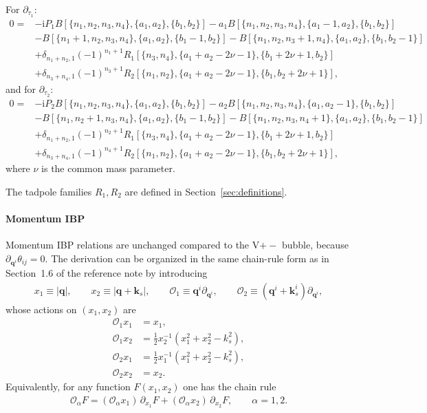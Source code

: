 \documentclass[a4paper,12pt]{article}
\def\pd{\partial}
\def\ii{\mathrm{i}}
\begin{document}
For $\pd_{\tau_1}$:
\begin{align}
	0 = & - \ii P_1 B[\{n_1,n_2,n_3,n_4\},\{a_1,a_2\},\{b_1,b_2\}] - a_1B[\{n_1,n_2,n_3,n_4\},\{a_1-1,a_2\},\{b_1,b_2\}]\nonumber \\
	    & - B[\{n_1+1,n_2,n_3,n_4\},\{a_1,a_2\},\{b_1-1,b_2\}] - B[\{n_1,n_2,n_3+1,n_4\},\{a_1,a_2\},\{b_1,b_2-1\}]\nonumber      \\
	    & +\delta_{n_1+n_2,1}(-1)^{n_1+1}R_1[\{n_3,n_4\},\{a_1+a_2-2\nu-1\},\{b_1+2\nu+1,b_2\}]\nonumber                \\
	    & +\delta_{n_3+n_4,1}(-1)^{n_3+1}R_2[\{n_1,n_2\},\{a_1+a_2-2\nu-1\},\{b_1,b_2+2\nu+1\}], \label{eq:timeIBP_tau1}
\end{align}
and for $\partial_{\tau_2}$:
\begin{align}
	0 = & - \ii P_2 B[\{n_1,n_2,n_3,n_4\},\{a_1,a_2\},\{b_1,b_2\}] - a_2B[\{n_1,n_2,n_3,n_4\},\{a_1,a_2-1\},\{b_1,b_2\}]\nonumber \\
	    & - B[\{n_1,n_2+1,n_3,n_4\},\{a_1,a_2\},\{b_1-1,b_2\}] - B[\{n_1,n_2,n_3,n_4+1\},\{a_1,a_2\},\{b_1,b_2-1\}]\nonumber      \\
	    & +\delta_{n_1+n_2,1}(-1)^{n_2+1}R_1[\{n_3,n_4\},\{a_1+a_2-2\nu-1\},\{b_1+2\nu+1,b_2\}]\nonumber                \\
	    & +\delta_{n_3+n_4,1}(-1)^{n_4+1}R_2[\{n_1,n_2\},\{a_1+a_2-2\nu-1\},\{b_1,b_2+2\nu+1\}], \label{eq:timeIBP_tau2}
\end{align}
where $\nu$ is the common mass parameter.

The tadpole families $R_1,R_2$ are defined in Section~\ref{sec:definitions}.

\paragraph{Momentum IBP}
Momentum IBP relations are unchanged compared to the V$+-$ bubble, because $\pd_{\bm q^i}\theta_{ij}=0$. The derivation can be organized in the same chain-rule form as in Section~1.6 of the reference note by introducing
\begin{align}
	x_1 \equiv |\bm q|,\qquad x_2 \equiv |\bm q+\bm k_s|,\qquad
	\mathcal{O}_1 \equiv \bm q^i \pd_{\bm q^i},\qquad
	\mathcal{O}_2 \equiv (\bm q^i+\bm k_s^i)\pd_{\bm q^i},
\end{align}
whose actions on $(x_1,x_2)$ are
\begin{align}
	\mathcal{O}_1 x_1 & = x_1, \nonumber\\
	\mathcal{O}_1 x_2 & = \frac{1}{2}x_2^{-1}(x_1^2 + x_2^2 - k_s^2), \nonumber\\
	\mathcal{O}_2 x_1 & = \frac{1}{2}x_1^{-1}(x_1^2 + x_2^2 - k_s^2), \nonumber\\
	\mathcal{O}_2 x_2 & = x_2.
\end{align}
Equivalently, for any function $F(x_1,x_2)$ one has the chain rule
\begin{align}
	\mathcal{O}_\alpha F = (\mathcal{O}_\alpha x_1)\,\partial_{x_1}F + (\mathcal{O}_\alpha x_2)\,\partial_{x_2}F,\qquad \alpha=1,2.
\end{align}
\end{document}
